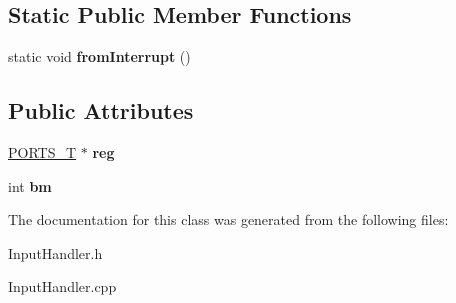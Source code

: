 \subsection*{Static Public Member Functions}
\begin{DoxyCompactItemize}
\item 
\mbox{\label{class_i_o_1_1_input_pin_a7c17b79816d153395c7ff54c378bd1c9}} 
static void {\bfseries from\+Interrupt} ()
\end{DoxyCompactItemize}
\subsection*{Public Attributes}
\begin{DoxyCompactItemize}
\item 
\mbox{\label{class_i_o_1_1_input_pin_a02649b08485820e911b7a27360e20757}} 
\hyperlink{struct_i_o_1_1_p_o_r_t_s___t}{P\+O\+R\+T\+S\+\_\+T} $\ast$ {\bfseries reg}
\item 
\mbox{\label{class_i_o_1_1_input_pin_a06f146a0757c619902faa0b15f5e8123}} 
int {\bfseries bm}
\end{DoxyCompactItemize}


The documentation for this class was generated from the following files\+:\begin{DoxyCompactItemize}
\item 
Input\+Handler.\+h\item 
Input\+Handler.\+cpp\end{DoxyCompactItemize}

